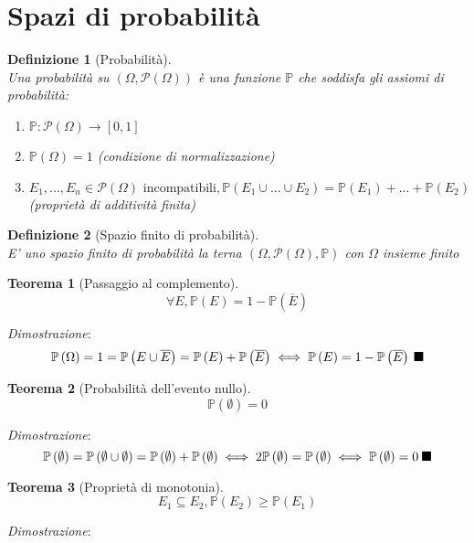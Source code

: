 \documentclass{article}
\newtheorem{theorem}{Teorema}[section]
\newtheorem{definition}{Definizione}[section]
\newcommand{\qed}{\rule{0.7em}{0.7em}}
\newcommand{\Prob}[1]{\mathbb{P}\left(#1\right)}
\begin{document}
\section{Spazi di probabilità}
    \begin{definition}[Probabilità] \, \\
        Una probabilità su $\left(\Omega, \mathcal{P}\left(\Omega\right)\right)$ è una funzione 
        $\mathbb{P}$ che soddisfa gli assiomi di probabilità:
        \begin{enumerate}
            \item $\mathbb{P}: \mathcal{P}\left(\Omega\right) \to \left[0, 1\right]$
            \item $\mathbb{P}\left(\Omega\right) = 1$ (condizione di normalizzazione)
            \item $E_1, ..., E_n \in \mathcal{P}\left(\Omega\right) \textrm{ incompatibili}, \mathbb{P}\left(E_1 \cup ... \cup E_2\right) 
                = \mathbb{P}\left(E_1\right) + ... + \mathbb{P}\left(E_2\right)$ (proprietà di additività finita)
        \end{enumerate}
    \end{definition}
    \begin{definition}[Spazio finito di probabilità] \, \\
        E' uno spazio finito di probabilità la terna $\left(\Omega, \mathcal{P}\left(\Omega\right), \mathbb{P}\right)$
        con $\Omega$ insieme finito
    \end{definition}
    \begin{theorem}[Passaggio al complemento] \, \\
        $$\forall E, \mathbb{P}\left(E\right) = 1 - \mathbb{P}\left(\overline{E}\right)$$
    \end{theorem}
    \textit{Dimostrazione}:
        $$\Prob{\Omega} = 1 = \Prob{E \cup \overline{E}} = \Prob{E} + \Prob{\overline{E}} \iff \Prob{E} = 1 - \Prob{\overline{E}} \; \qed$$
    \begin{theorem}[Probabilità dell'evento nullo]
        $$\Prob{\emptyset} = 0$$
    \end{theorem}
    \textit{Dimostrazione}:
        $$\Prob{\emptyset} = \Prob{\emptyset \cup \emptyset} = \Prob{\emptyset} + \Prob{\emptyset} \iff 2\Prob{\emptyset} = \Prob{\emptyset} \iff \Prob{\emptyset} = 0 \; \qed$$
    \begin{theorem}[Proprietà di monotonia]
        $$E_1 \subseteq E_2, \Prob{E_2} \geq \Prob{E_1}$$
    \end{theorem}
    \textit{Dimostrazione}:
\end{document}
